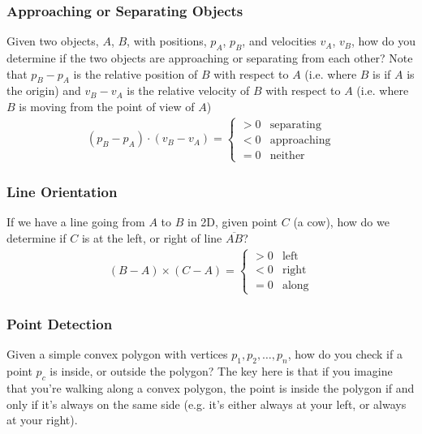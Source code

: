 \documentclass[12pt]{report}
\begin{document}
		\subsubsection{Approaching or Separating Objects}
		Given two objects, $A$, $B$, with positions, $p_A$, $p_B$, and velocities $v_A$, $v_B$, how do you determine if the two objects are approaching or separating from each other?
		Note that $p_B - p_A$ is the relative position of $B$ with respect to $A$ (i.e. where $B$ is if $A$ is the origin) and $v_B - v_A$ is the relative velocity of $B$ with respect to $A$ (i.e. where $B$ is moving from the point of view of $A$)
		\begin{align}
			(p_B - p_A) \cdot (v_B - v_A) = 
			\begin{cases}
				> 0 & \text{separating} \\
				< 0 & \text{approaching} \\
				= 0 & \text{neither}
			\end{cases}
		\end{align}
		
		\subsubsection{Line Orientation}
		
		If we have a line going from $A$ to $B$ in 2D, given point $C$ (a cow), how do we determine if $C$ is at the left, or right of line $\overline{AB}$?
		\begin{align}
		(B - A) \times (C - A) = \begin{cases}
		> 0 & \text{left}\\
		< 0 & \text{right}\\
		= 0 & \text{along}
		\end{cases}
		\end{align}
		\subsubsection{Point Detection}
		Given a simple convex polygon with vertices $p_1, p_2, \dots, p_n$, how do you check if a point $p_c$ is inside, or outside the polygon? The key here is that if you imagine that you're walking along a convex polygon, the point is inside the polygon if and only if it's always on the same side (e.g. it's either always at your left, or always at your right).
		
\end{document}
